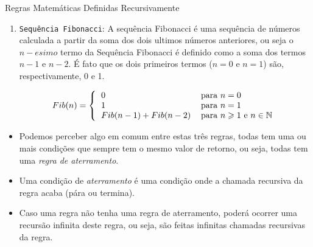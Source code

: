 \begin{frame}[c,allowframebreaks]{Regras Matemáticas Definidas Recursivamente}
\begin{enumerate}
            \framebreak
    
            \item \texttt{Sequência Fibonacci}: A sequência Fibonacci é uma sequência de números calculada a partir da soma dos
            dois ultimos números anteriores, ou seja o $n-esimo$ termo da Sequência Fibonacci é definido como a soma dos termos
            $n-1$ e $n-2$. É fato que os dois primeiros termos ($n = 0$ e $n = 1$) são, respectivamente, 0 e 1.
            
            \[
            Fib(n)=\left\{
            \begin{tabular}[c]{ll}%
                $0$ & para $n = 0$\\
                $1$ & para $n = 1$\\
                $Fib(n-1) + Fib(n-2)$ & para $n\geqslant1$ e $n \in \mathbb{N}$
            \end{tabular}
            \right.
            \]
            
        \end{enumerate}
        
        \framebreak
        
        \begin{itemize}
            
            \item Podemos perceber algo em comum entre estas três regras, todas tem uma ou mais
            condições que sempre tem o mesmo valor de retorno, ou seja, todas tem uma \textit{regra de  aterramento}.
            
            \item Uma condição de \textit{aterramento} é uma condição onde a chamada recursiva da regra
            acaba (pára ou termina).
            
            \item Caso uma regra não tenha uma regra de aterramento, poderá ocorrer uma recursão infinita deste regra, ou seja, são feitas infinitas chamadas recursivas
            da regra.
        \end{itemize}
 
\end{frame}


